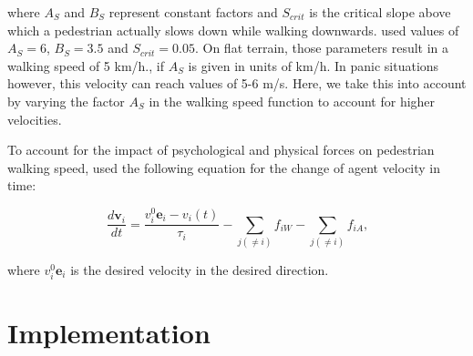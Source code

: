 \documentclass[11pt]{article}
\begin{document}
where $A_S$ and $B_{S}$ represent constant factors and $S_{crit}$ is the critical slope above which a pedestrian actually slows down while walking downwards. \citet{tobler} used values of $A_S = 6$, $B_S = 3.5$ and $S_{crit} = 0.05$. On flat terrain, those parameters result in a walking speed of 5 km/h., if $A_S$ is given in units of km/h. In panic situations however, this velocity can reach values of 5-6 m/s. Here, we take this into account by varying the factor $A_S$ in the walking speed function to account for higher velocities.

To account for the impact of psychological and physical forces on pedestrian walking speed, \citet{Helbing2000} used the following equation for the change of agent velocity in time:

\begin{equation}
	\frac{d \mathbf{v}_i}{dt} = \frac{v_i^0\mathbf{e}_i - v_i(t)}{\tau_i} - \sum_{j(\ne i)}f_{iW} - \sum_{j(\ne i)}f_{iA}\mbox{,}
\end{equation}

where $v_i^0\mathbf{e}_i$ is the desired velocity in the desired direction.

\section{Implementation}\label{sec:implementation}
\end{document}
